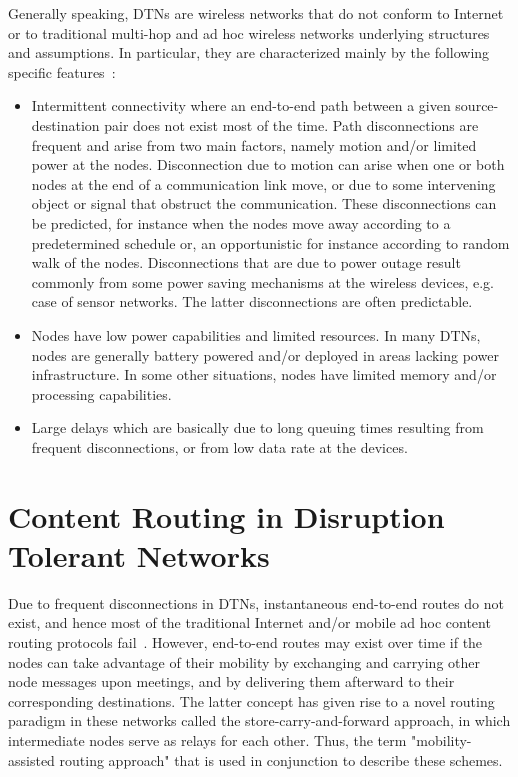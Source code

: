 Generally speaking, DTNs are wireless networks that do not conform to Internet or to traditional multi-hop and ad hoc wireless networks underlying structures and assumptions.
In particular, they are characterized mainly by the following specific features~\cite{fall03, DTNTutorial}:

\begin{itemize}
\item{Intermittent connectivity where an end-to-end path between a given source-destination pair does not exist most of the time. Path disconnections are frequent and arise from
two main factors, namely motion and/or limited power at the nodes. Disconnection due to motion can arise when one or both nodes at the end of a communication link
move, or due to some intervening object or signal that obstruct the communication. These disconnections can be predicted, for instance when the nodes move away
according to a predetermined schedule or, an opportunistic for instance according to random walk of the nodes. Disconnections that are due to power outage result
commonly from some power saving mechanisms at the wireless devices, e.g. case of sensor networks. The latter disconnections are often predictable.}
\item{Nodes have low power capabilities and limited resources. In many DTNs, nodes are generally battery powered and/or deployed in areas lacking power infrastructure. In
some other situations, nodes have limited memory and/or processing capabilities.}
\item{Large delays which are basically due to long queuing times resulting from frequent disconnections, or from low data rate at the devices.}
\end{itemize}

\section{Content Routing in Disruption Tolerant Networks}

Due to frequent disconnections in DTNs, instantaneous end-to-end routes do not exist, and hence most of the traditional Internet and/or mobile ad hoc content routing protocols fail~\cite{Fall:DTNrouting}. However, end-to-end routes may exist over time if the nodes can take advantage of their mobility by exchanging and carrying other node messages upon meetings, and by delivering them afterward to their corresponding destinations. The latter concept has given rise to a novel routing paradigm in these networks called the store-carry-and-forward approach, in which intermediate nodes serve as relays for each other. Thus, the term "mobility-assisted routing approach" that is used in conjunction to describe these schemes.

